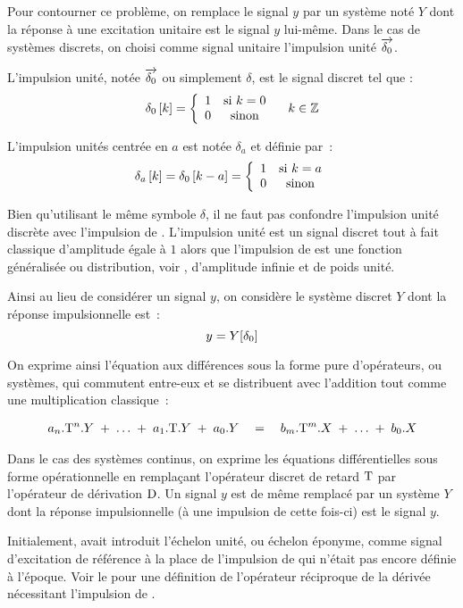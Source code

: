 Pour contourner ce problème, on remplace le signal $y$ par un système
noté $Y$ dont la réponse à une excitation unitaire est le signal $y$
lui-même. Dans le cas de systèmes discrets, on choisi comme signal
unitaire l'impulsion unité $\d0$.

\begin{definition}
  \label{def:impulsion_unite}
  L'impulsion unité, notée $\d0$ ou simplement $\delta$, est le signal discret tel que :
  $$
  \delta_0\left[k\right]=\left\{\begin{array}{cc} {1} & {\text{si } k=0}\\ {0} & {\text{sinon}}\\ \end{array}\right. \quad k\in\mathbb{Z}
  $$

  L'impulsion unités centrée en $a$ est notée $\delta_a$ et définie par~:
  $$
  \delta_a\left[k\right]=\delta_0\left[k-a\right] = \left\{\begin{array}{cc} {1} & {\text{si } k=a}\\ {0} & {\text{sinon}}\\ \end{array}\right.
  $$

  Bien qu'utilisant le même symbole $\delta$, il ne faut pas confondre
  l'impulsion unité discrète avec l'impulsion de \Dirac. L'impulsion
  unité est un signal discret tout à fait classique d'amplitude égale
  à $1$ alors que l'impulsion de \Dirac{} est une fonction généralisée
  ou distribution, voir , d'amplitude infinie et de
  poids unité.
\end{definition}

Ainsi au lieu de considérer un signal $y$, on considère le système discret $Y$ dont la réponse impulsionnelle est~:
\begin{equation}
  y = Y\!\left[\delta_0\right]
\end{equation}



On exprime ainsi l'équation aux différences sous la forme pure
d'opérateurs, ou systèmes, qui commutent entre-eux et se distribuent
avec l'addition tout comme une multiplication classique~:

\begin{eqnarray}
  a_n.\mathrm{T}^n.Y\; +\; \ldots \;+\; a_1.\mathrm{T}.Y \;+\; a_0.Y \quad  = \quad b_m.\mathrm{T}^m.X \;+\; \ldots \;+\; b_0.X
\end{eqnarray}

\begin{remarque}
  Dans le cas des systèmes continus, on exprime les équations
  différentielles sous forme opérationnelle en remplaçant l'opérateur
  discret de retard $\mathrm{T}$ par l'opérateur de dérivation $\mathrm{D}$. Un
  signal $y$ est de même remplacé par un système $Y$ dont la réponse
  impulsionnelle (à une impulsion de \Dirac{} cette fois-ci) est le
  signal $y$.

  Initialement, \Heaviside{} avait introduit l'échelon unité, ou
  échelon éponyme, comme signal d'excitation de référence à la place
  de l'impulsion de \Dirac{} qui n'était pas encore définie à
  l'époque. Voir le  pour une définition de
  l'opérateur réciproque de la dérivée nécessitant l'impulsion de
  \Dirac{}.
\end{remarque}

